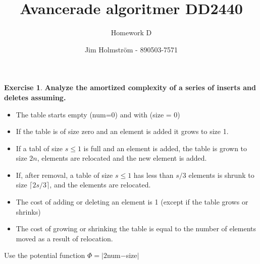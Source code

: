 \documentclass[a4paper,twoside=false,abstract=false,numbers=noenddot,
titlepage=false,headings=small,parskip=half,version=last]{scrartcl}
\author{Jim Holmström - 890503-7571}
\title{Avancerade algoritmer DD2440}
\subtitle{Homework D}
\theoremstyle{definition}
\newtheorem{exercise}{Exercise}
\theoremstyle{remark}
\begin{document}
\maketitle
\thispagestyle{empty}

\begin{exercise}
{\bf
Analyze the amortized complexity of a series of inserts and deletes assuming.
\begin{itemize}
    \item The table starts empty (num=0) and with (size = 0) 
    \item If the table is of size zero and an element is added it grows to size 1.
    \item If a tabl of size $s \le 1$ is full and an element is added, the table is grown to size $2n$, elements are relocated and the new element is added.
    \item If, after removal, a table of size $s \le 1$ has less than $s/3$ elements is shrunk to size $\lceil 2s/3 \rceil$, and the elements are relocated.
    \item The cost of adding or deleting an element is 1 (except if the table grows or shrinks)
    \item The cost of growing or shrinking the table is equal to the number of elements moved as a result of relocation.
\end{itemize}
Use the potential function $\Phi = |2$num$-$size$|$
}
\end{exercise}
\end{document}
